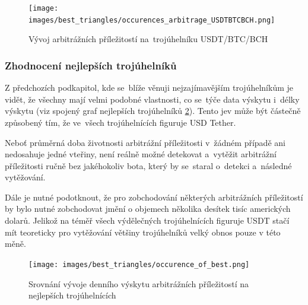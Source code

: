 \documentclass[thesis=B,czech]{FITthesis}[2019/03/21]
\begin{document}
\begin{figure}\centering
	\texttt{[image: images/best\_triangles/occurences\_arbitrage\_USDTBTCBCH.png]}
	\caption{Vývoj arbitrážních příležitostí na~trojúhelníku USDT/BTC/BCH }\label{occurences_arbitrage_USDTBTCBCH}
\end{figure}

\subsubsection{Zhodnocení nejlepších trojúhelníků}
Z předchozích podkapitol, kde se~blíže věnuji nejzajímavějším trojúhelníkům je vidět, že všechny mají velmi podobné vlastnosti, co se~týče data výskytu i~délky výskytu (viz spojený graf nejlepších trojúhelníků \ref{occurence_of_best}). Tento jev může být částečně způsobený tím, že ve~všech trojúhelnících figuruje USD Tether. 

Neboť průměrná doba životnosti arbitrážní příležitosti v~žádném případě ani nedosahuje jedné vteřiny, není reálně možné detekovat a~vytěžit arbitrážní příležitosti ručně bez jakéhokoliv bota, který by se~staral o~detekci a~následné vytěžování. 

Dále je nutné podotknout, že pro zobchodování některých arbitrážních příležitostí by bylo nutné zobchodovat jmění o objemech několika desítek tisíc amerických dolarů. Jelikož na téměř všech výdělečných trojúhelnících figuruje USDT stačí mít teoreticky pro vytěžování většiny trojúhelníků velký obnos pouze v této měně.

\begin{figure}\centering
	\texttt{[image: images/best\_triangles/occurence\_of\_best.png]}
	\caption{Srovnání vývoje denního výskytu arbitrážních příležitostí na nejlepších trojúhelnících }\label{occurence_of_best}
\end{figure}
\end{document}
